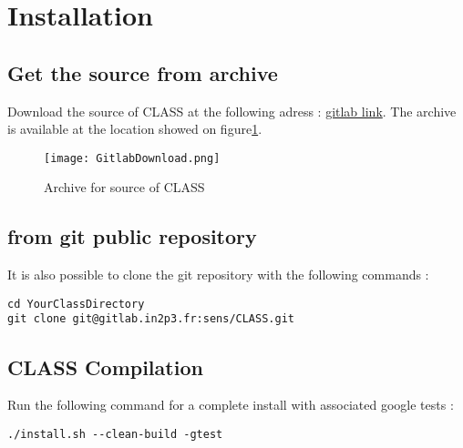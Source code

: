 \section{Installation}

\subsection{Get the source from archive}

Download the source of CLASS at the following adress : \href{https://gitlab.in2p3.fr/sens/CLASS/tree/master}{gitlab link}. The archive is available at the location showed on figure\ref{fig:CLASSArchive}.

    \begin{figure}[H]
    \centering
    \centerline{\texttt{[image: GitlabDownload.png]}}
    \caption{Archive for source of CLASS}
    \label{fig:CLASSArchive}
    \end{figure}

\subsection{from git public repository}

It is also possible to clone the git repository with the following commands : 

\begin{center}
\begin{minipage}{\textwidth}
\begin{lstlisting}[style=terminal]
cd YourClassDirectory
git clone git@gitlab.in2p3.fr:sens/CLASS.git
\end{lstlisting}
\end{minipage}
\end{center}

\subsection{CLASS Compilation}

Run the following command for a complete install with associated google tests : 

\begin{center}
\begin{minipage}{\textwidth}
\begin{lstlisting}[style=terminal]
./install.sh --clean-build -gtest
\end{lstlisting}
\end{minipage}
\end{center}

